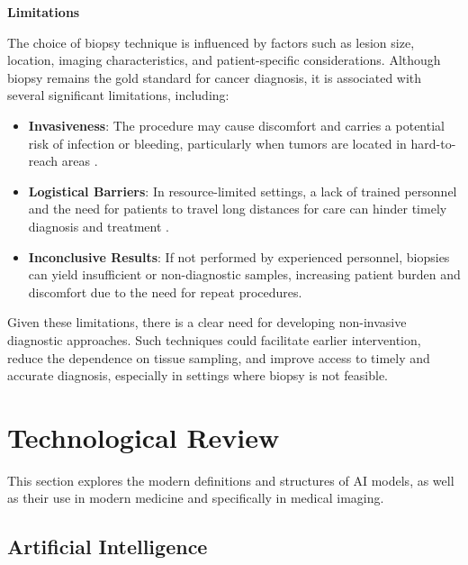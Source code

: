 \documentclass[a4paper,10pt]{book}
\begin{document}
\textbf{Limitations}

The choice of biopsy technique is influenced by factors such as lesion size, location, imaging characteristics, and patient-specific considerations. Although biopsy remains the gold standard for cancer diagnosis, it is associated with several significant limitations, including:

\begin{itemize}
    \item \textbf{Invasiveness}: The procedure may cause discomfort and carries a potential risk of infection or bleeding, particularly when tumors are located in hard-to-reach areas \cite{amino_pros_2024}.
    \item \textbf{Logistical Barriers}: In resource-limited settings, a lack of trained personnel and the need for patients to travel long distances for care can hinder timely diagnosis and treatment \cite{silva_breast_2023}.
    \item \textbf{Inconclusive Results}: If not performed by experienced personnel, biopsies can yield insufficient or non-diagnostic samples, increasing patient burden and discomfort due to the need for repeat procedures.
\end{itemize}

Given these limitations, there is a clear need for developing non-invasive diagnostic approaches. Such techniques could facilitate earlier intervention, reduce the dependence on tissue sampling, and improve access to timely and accurate diagnosis, especially in settings where biopsy is not feasible.


\chapter{Technological Review}

This section explores the modern definitions and structures of AI models, as well as their use in modern medicine and specifically in medical imaging.

\section{Artificial Intelligence}
\end{document}
